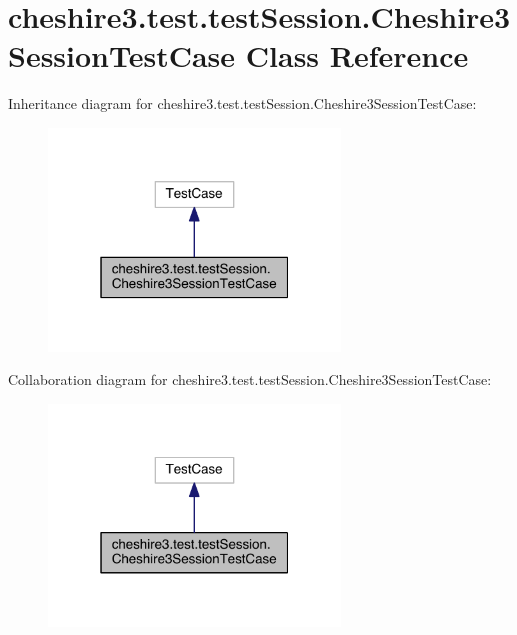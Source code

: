 \hypertarget{classcheshire3_1_1test_1_1test_session_1_1_cheshire3_session_test_case}{\section{cheshire3.\-test.\-test\-Session.\-Cheshire3\-Session\-Test\-Case Class Reference}
\label{classcheshire3_1_1test_1_1test_session_1_1_cheshire3_session_test_case}
}


Inheritance diagram for cheshire3.\-test.\-test\-Session.\-Cheshire3\-Session\-Test\-Case\-:
\nopagebreak
\begin{figure}[H]
\begin{center}
\leavevmode
\includegraphics[width=220pt]{classcheshire3_1_1test_1_1test_session_1_1_cheshire3_session_test_case__inherit__graph}
\end{center}
\end{figure}


Collaboration diagram for cheshire3.\-test.\-test\-Session.\-Cheshire3\-Session\-Test\-Case\-:
\nopagebreak
\begin{figure}[H]
\begin{center}
\leavevmode
\includegraphics[width=220pt]{classcheshire3_1_1test_1_1test_session_1_1_cheshire3_session_test_case__coll__graph}
\end{center}
\end{figure}
